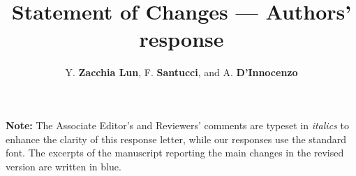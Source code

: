 \documentclass{article}
\title{\textbf{Statement of Changes --- Authors' response}}
\author{Y. \textbf{Zacchia Lun}, F. \textbf{Santucci}, and A. \textbf{D'Innocenzo}}
\date{\vspace{-5ex}}
\renewcommand{\!}{\tmspace-\thinmuskip{.1667em}}
\begin{document}

\maketitle
\tableofcontents
\vspace{2cm}
\noindent \textbf{Note:} The Associate Editor's and Reviewers' comments are typeset in \textit{italics} to enhance the clarity of this response letter, while our responses use the standard font. The excerpts of the manuscript reporting the main changes in the revised version are written in blue.





\end{document}
